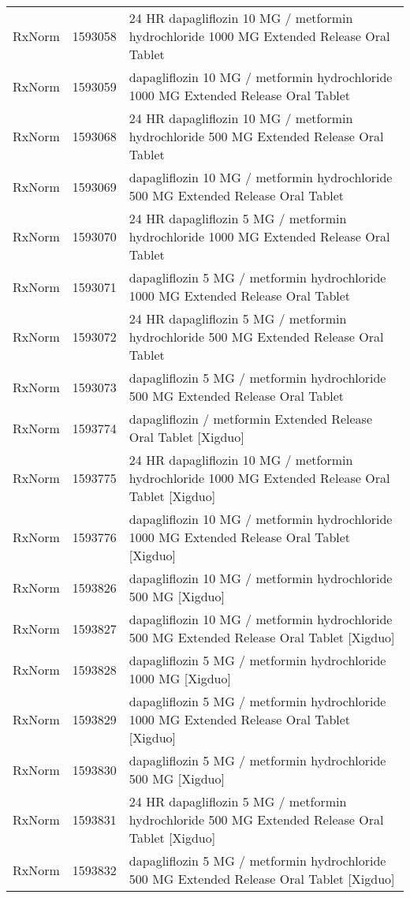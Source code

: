 \begin{longtable}{p{}p{}p{}}
  RxNorm & 1593058 & 24 HR dapagliflozin 10 MG / metformin hydrochloride 1000 MG Extended Release Oral Tablet \\ 
  RxNorm & 1593059 & dapagliflozin 10 MG / metformin hydrochloride 1000 MG Extended Release Oral Tablet \\ 
  RxNorm & 1593068 & 24 HR dapagliflozin 10 MG / metformin hydrochloride 500 MG Extended Release Oral Tablet \\ 
  RxNorm & 1593069 & dapagliflozin 10 MG / metformin hydrochloride 500 MG Extended Release Oral Tablet \\ 
  RxNorm & 1593070 & 24 HR dapagliflozin 5 MG / metformin hydrochloride 1000 MG Extended Release Oral Tablet \\ 
  RxNorm & 1593071 & dapagliflozin 5 MG / metformin hydrochloride 1000 MG Extended Release Oral Tablet \\ 
  RxNorm & 1593072 & 24 HR dapagliflozin 5 MG / metformin hydrochloride 500 MG Extended Release Oral Tablet \\ 
  RxNorm & 1593073 & dapagliflozin 5 MG / metformin hydrochloride 500 MG Extended Release Oral Tablet \\ 
  RxNorm & 1593774 & dapagliflozin / metformin Extended Release Oral Tablet [Xigduo] \\ 
  RxNorm & 1593775 & 24 HR dapagliflozin 10 MG / metformin hydrochloride 1000 MG Extended Release Oral Tablet [Xigduo] \\ 
  RxNorm & 1593776 & dapagliflozin 10 MG / metformin hydrochloride 1000 MG Extended Release Oral Tablet [Xigduo] \\ 
  RxNorm & 1593826 & dapagliflozin 10 MG / metformin hydrochloride 500 MG [Xigduo] \\ 
  RxNorm & 1593827 & dapagliflozin 10 MG / metformin hydrochloride 500 MG Extended Release Oral Tablet [Xigduo] \\ 
  RxNorm & 1593828 & dapagliflozin 5 MG / metformin hydrochloride 1000 MG [Xigduo] \\ 
  RxNorm & 1593829 & dapagliflozin 5 MG / metformin hydrochloride 1000 MG Extended Release Oral Tablet [Xigduo] \\ 
  RxNorm & 1593830 & dapagliflozin 5 MG / metformin hydrochloride 500 MG [Xigduo] \\ 
  RxNorm & 1593831 & 24 HR dapagliflozin 5 MG / metformin hydrochloride 500 MG Extended Release Oral Tablet [Xigduo] \\ 
  RxNorm & 1593832 & dapagliflozin 5 MG / metformin hydrochloride 500 MG Extended Release Oral Tablet [Xigduo] \\ 

\end{longtable}
